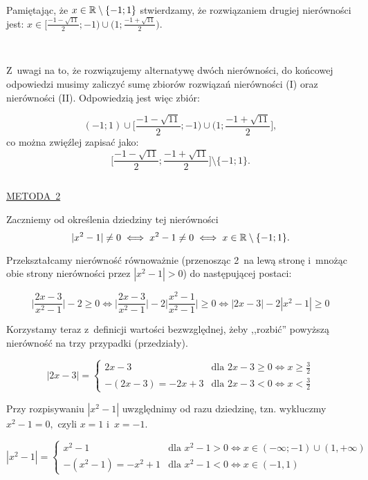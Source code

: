 \begin{rozw}
\begin{center}
\end{center}

$ $
$ $

Pamiętając, że $x \in \mathbb{R}\setminus \{-1;1\}$ stwierdzamy, że rozwiązaniem drugiej nierówności jest:
$ x \in \Big[\frac{-1-\sqrt{11}}{2}; -1\Big) \cup \Big(1; \frac{-1+\sqrt{11}}{2}\Big) .$

$ $
$ $

Z~uwagi na to, że rozwiązujemy alternatywę dwóch nierówności, do końcowej odpowiedzi musimy zaliczyć sumę zbiorów rozwiązań nierówności (I) oraz nierówności (II). Odpowiedzią jest więc zbiór: 

\[ (-1;1) \cup \Big[\frac{-1-\sqrt{11}}{2}; -1\Big) \cup \Big(1; \frac{-1+\sqrt{11}}{2}\Big], \]
co można zwięźlej zapisać jako:
\[ \Big[\frac{-1-\sqrt{11}}{2};\frac{-1+\sqrt{11}}{2}\Big] \setminus \{-1;1\}. \]

$ $

\underline{METODA~2}

Zaczniemy od określenia dziedziny tej nierówności
\[ |x^2-1| \neq 0 \iff x^2-1 \neq 0 \iff x\in \mathbb{R} \setminus \{-1;1\}. \]

Przekształcamy nierówność równoważnie (przenosząc 2~na lewą stronę i~mnożąc obie strony nierówności przez $|x^2-1|>0$) do następującej postaci:

\[  \Big|\frac{2x-3}{x^2-1}\Big| - 2 \geq 0 \iff \Big|\frac{2x-3}{x^2-1}\Big| - 2\Big|\frac{x^2-1}{x^2-1}\Big| \geq 0 \iff |2x-3| - 2|x^2-1| \geq 0 \]

Korzystamy teraz z~definicji wartości bezwzględnej, żeby ,,rozbić'' powyższą nierówność na trzy przypadki (przedziały). 

\[|2x-3| = \begin{cases}
          2x-3 & \text{dla } 2x-3 \geq 0 \iff x \geq \frac{3}{2}\\
          -(2x-3)=-2x+3 & \text{dla } 2x-3 < 0 \iff x < \frac{3}{2}
         \end{cases}
\]

Przy rozpisywaniu $|x^2-1|$ uwzględnimy od razu dziedzinę, tzn. wykluczmy $x^2-1 = 0,$ czyli $x=1$ i~$x=-1$.

\[|x^2-1| = \begin{cases}
             x^2-1 & \text{dla } x^2-1 >0  \iff x\in(-\infty;-1)\cup(1,+\infty)\\
             -(x^2-1)=-x^2+1 & \text{dla } x^2-1 < 0 \iff x\in(-1,1)
            \end{cases}
\]


\end{rozw}
